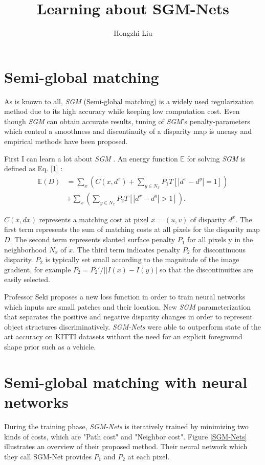 \documentclass[twocolumn]{article}
\author{Hongzhi Liu}
\title{Learning about SGM-Nets}
\begin{document}
	\maketitle
	\par
	\section{Semi-global matching}
	As is known to all, \emph{SGM} (Semi-global matching) is a widely used regularization method due to its high accuracy while keeping low computation cost. Even though \emph{SGM} can obtain accurate results, tuning of \emph{SGM}’s penalty-parameters which control a smoothness and discontinuity of a disparity map is uneasy and empirical methods have been proposed.
	
	First I can learn a lot about \emph{SGM} \cite{Hirschmuller2007Stereo}. An energy function $\mathbb{E}$ for solving \emph{SGM} is defined as Eq. \ref{1} :
	\begin{equation}
	\begin{split}
	\mathbb{E}(D) &=\sum_x \left( C(x,d^x) +\sum_{y\in N_x}P_1 T \left[ \left| d^x-d^y \right|=1 \right] \right)  \\
	&+\sum_x \left( \sum_{y\in N_x} P_2 T \left[ \left| d^x-d^y \right|>1 \right] \right).
	\end{split} \label{1}
	\end{equation}
	
	$C(x, dx)$ represents a matching cost at pixel $x = (u, v)$ of disparity $d^x$. The first term represents the sum of matching costs at all pixels for the disparity map $D$. The second term represents slanted surface penalty $P_1$ for all pixels y in the neighborhood $N_x$ of $x$. The third term indicates penalty $P_2$ for discontinuous disparity. $P_2$ is typically set small according to the magnitude of the image gradient, for example $P_2 = P_2'/\left||I(x) − I(y)\right| $ so that the discontinuities are easily selected.
	
	Professor Seki proposes a new loss function in order to train neural networks which inputs are small patches and their location. New \emph{SGM} parameterization that separates the positive and negative disparity changes in order to represent object structures discriminatively. \emph{SGM-Nets} were able to outperform state of the art accuracy on KITTI datasets without the need for an explicit foreground shape prior such as a vehicle.
	
    \section{Semi-global matching with neural networks}
	During the training phase, \emph{SGM-Nets} is iteratively trained by minimizing two kinds of costs, which are "Path cost" and "Neighbor cost". Figure \ref{SGM-Nets} illustrates an overview of their proposed method. Their neural network which they call SGM-Net provides $P_1$ and $P_2$ at each pixel.
	
\end{document}
